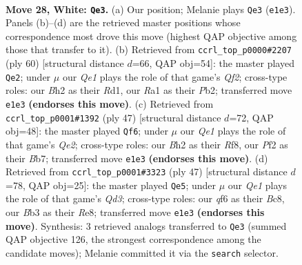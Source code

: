 \documentclass[11pt]{article}
\begin{document}
\clearpage

\begin{figure}[p]\centering
\begin{subfigure}{0.46\textwidth}\centering
\resizebox{\linewidth}{!}{%
\newchessgame
\chessboard[
  setfen={r5k1/1p3pb1/1nn2qp1/p2p4/3P3p/1B5P/PP3PPB/RN2Q1K1 w - - 0 28},
  showmover=false,
  pgfstyle=straightmove, color=movearrow, markmove={e1-e3}
]}
\caption{}
\end{subfigure}\hfill
\begin{subfigure}{0.46\textwidth}\centering
\resizebox{\linewidth}{!}{%
\newchessgame
\chessboard[
  setfen={3r2k1/1bq2p1p/1p2p1p1/pB1nP1P1/8/P4P2/1P1B1QP1/3R2K1 w - - 9 31},
  showmover=false,
  pgfstyle=straightmove, color=movearrow, markmove={f2-e2}
]}
\caption{}
\end{subfigure}
\\[4pt]
\begin{subfigure}{0.46\textwidth}\centering
\resizebox{\linewidth}{!}{%
\newchessgame
\chessboard[
  setfen={5rk1/1b2qpp1/1p1b3p/p2p4/3N4/1PQ1P2B/P4PPP/2R3K1 b - - 1 24},
  showmover=false,
  pgfstyle=straightmove, color=movearrow, markmove={e7-f6}
]}
\caption{}
\end{subfigure}\hfill
\begin{subfigure}{0.46\textwidth}\centering
\resizebox{\linewidth}{!}{%
\newchessgame
\chessboard[
  setfen={2b1r1k1/1p3pp1/3q3p/pP1p4/Pb1N4/3QB2P/1P3PP1/3R2K1 b - - 6 24},
  showmover=false,
  pgfstyle=straightmove, color=movearrow, markmove={d6-e5}
]}
\caption{}
\end{subfigure}
\caption{\textbf{Move 28, White: \texttt{Qe3}.} (a) Our position; Melanie plays \texttt{Qe3} (\texttt{e1e3}). Panels (b)--(d) are the retrieved master positions whose correspondence most drove this move (highest QAP objective among those that transfer to it). (b) Retrieved from \texttt{ccrl\_top\_p0000\#2207} (ply 60) [structural distance $d$=66, QAP obj=54]: the master played \texttt{Qe2}; under $\mu$ our \emph{Qe1} plays the role of that game's \emph{Qf2}; cross-type roles: our \emph{B}h2 as their \emph{R}d1, our \emph{R}a1 as their \emph{P}b2; transferred move \texttt{e1e3} \textbf{(endorses this move)}. (c) Retrieved from \texttt{ccrl\_top\_p0001\#1392} (ply 47) [structural distance $d$=72, QAP obj=48]: the master played \texttt{Qf6}; under $\mu$ our \emph{Qe1} plays the role of that game's \emph{Qe2}; cross-type roles: our \emph{B}h2 as their \emph{R}f8, our \emph{P}f2 as their \emph{B}b7; transferred move \texttt{e1e3} \textbf{(endorses this move)}. (d) Retrieved from \texttt{ccrl\_top\_p0001\#3323} (ply 47) [structural distance $d$=78, QAP obj=25]: the master played \texttt{Qe5}; under $\mu$ our \emph{Qe1} plays the role of that game's \emph{Qd3}; cross-type roles: our \emph{q}f6 as their \emph{B}c8, our \emph{B}b3 as their \emph{R}e8; transferred move \texttt{e1e3} \textbf{(endorses this move)}. Synthesis: 3 retrieved analogs transferred to \texttt{Qe3} (summed QAP objective 126, the strongest correspondence among the candidate moves); Melanie committed it via the \texttt{search} selector.}
\label{fig:thought-m54}
\end{figure}
\end{document}
